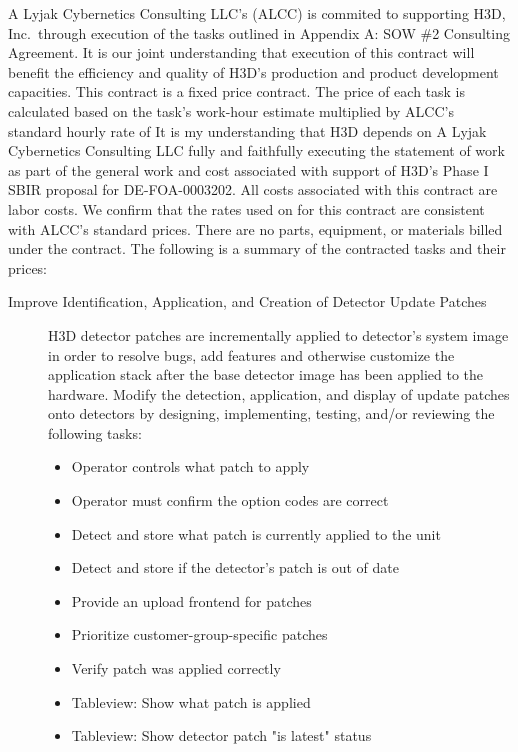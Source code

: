 \documentclass[8pt, letterpaper]{awesome-cv} %
\begin{document}
\makecvheader %

\makelettertitle %


\begin{cvletter}
  A Lyjak Cybernetics Consulting LLC's (ALCC) is commited to supporting H3D, Inc.\ through execution
  of the tasks outlined in Appendix A: SOW \#2 Consulting Agreement. It is our joint understanding
  that execution of this contract will benefit the efficiency and quality of H3D's production and
  product development capacities. This contract is a fixed price contract. The price of each task is
  calculated based on the task's work-hour estimate multiplied by ALCC's standard hourly rate of
   It is my understanding that H3D depends on A Lyjak Cybernetics
  Consulting LLC fully and faithfully executing the statement of work as part of the general work
  and cost associated with support of H3D's Phase I SBIR proposal for DE-FOA-0003202. All costs
  associated with this contract are labor costs. We confirm that the rates used on for this contract
  are consistent with ALCC's standard prices. There are no parts, equipment, or materials billed
  under the contract. The following is a summary of the contracted tasks and their prices:

  \begin{description}
    \item[Improve Identification, Application, and Creation of Detector Update Patches] H3D detector
      patches are incrementally applied to detector’s system image in order to resolve bugs, add
      features and otherwise customize the application stack after the base detector image has been
      applied to the hardware.  Modify the detection, application, and display of update patches
      onto detectors by designing, implementing, testing, and/or reviewing the following tasks:

      \begin{itemize}
        \item Operator controls what patch to apply
        \item Operator must confirm the option codes are correct
        \item Detect and store what patch is currently applied to the unit
        \item Detect and store if the detector’s patch is out of date
        \item Provide an upload frontend for patches
        \item Prioritize customer-group-specific patches
        \item Verify patch was applied correctly
        \item Tableview: Show what patch is applied
        \item Tableview: Show detector patch "is latest" status
      \end{itemize}


\end{description}
\end{cvletter}
\end{document}

